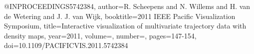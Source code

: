 @INPROCEEDINGS{5742384,
  author={R. {Scheepens} and N. {Willems} and H. {van de Wetering} and J. J. {van Wijk}},
  booktitle={2011 IEEE Pacific Visualization Symposium}, 
  title={Interactive visualization of multivariate trajectory data with density maps}, 
  year={2011},
  volume={},
  number={},
  pages={147-154},
  doi={10.1109/PACIFICVIS.2011.5742384}}